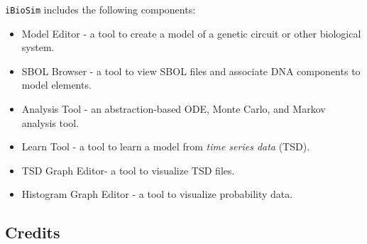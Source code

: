 \documentclass[titlepage,11pt]{article}
\begin{document}
{\tt iBioSim} includes the following components: 
\begin{itemize}
\item Model Editor - a tool to create a model of a genetic circuit or other biological system.
\item SBOL Browser - a tool to view SBOL files and associate DNA components to model elements.
\item Analysis Tool - an abstraction-based ODE, Monte Carlo, and Markov analysis tool.
\item Learn Tool - a tool to learn a model from \emph{time series data} (TSD).
\item TSD Graph Editor- a tool to visualize TSD files. 
\item Histogram Graph Editor - a tool to visualize probability data. 
\end{itemize}

\subsection*{Credits}
\end{document}
